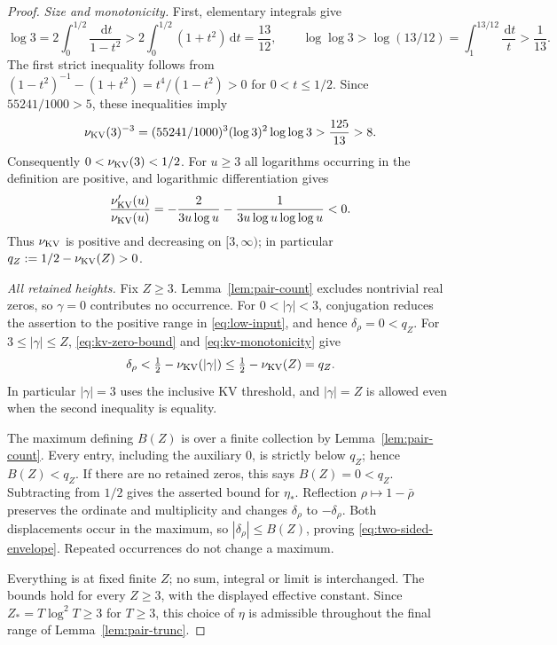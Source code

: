 \documentclass[11pt]{article}
\newcommand{\dd}{\,\mathrm d}
\begin{document}
\begin{proof}
\textit{Size and monotonicity.}
First, elementary integrals give
\[
 \log3=2\int_0^{1/2}\frac{\dd t}{1-t^2}
 >2\int_0^{1/2}(1+t^2)\dd t=\frac{13}{12},
 \qquad
 \log\log3>\log(13/12)
 =\int_1^{13/12}\frac{\dd t}{t}>\frac1{13}.
\]
The first strict inequality follows from
\((1-t^2)^{-1}-(1+t^2)=t^4/(1-t^2)>0\) for \(0<t\leq1/2\).
Since \(55241/1000>5\), these inequalities imply
\[
 \nu_{\rm KV}(3)^{-3}
 =(55241/1000)^3(\log3)^2\log\log3
 >\frac{125}{13}>8.
\]
Consequently \(0<\nu_{\rm KV}(3)<1/2\).
For \(u\geq3\) all logarithms occurring in the definition are positive,
and logarithmic differentiation gives
\begin{equation}\label{eq:kv-monotonicity}
 \frac{\nu_{\rm KV}'(u)}{\nu_{\rm KV}(u)}
 =-\frac{2}{3u\log u}
  -\frac{1}{3u\log u\log\log u}<0.
\end{equation}
Thus \(\nu_{\rm KV}\) is positive and decreasing on \([3,\infty)\);
in particular \(q_Z:=1/2-\nu_{\rm KV}(Z)>0\).

\textit{All retained heights.}
Fix \(Z\geq3\). Lemma~\ref{lem:pair-count} excludes nontrivial real
zeros, so \(\gamma=0\) contributes no occurrence.
For \(0<|\gamma|<3\), conjugation reduces the assertion to the positive
range in \eqref{eq:low-input}, and hence
\(\delta_\rho=0<q_Z\).
For \(3\leq|\gamma|\leq Z\), \eqref{eq:kv-zero-bound} and
\eqref{eq:kv-monotonicity} give
\[
 \delta_\rho<\tfrac12-\nu_{\rm KV}(|\gamma|)
 \leq\tfrac12-\nu_{\rm KV}(Z)=q_Z.
\]
In particular \(|\gamma|=3\) uses the inclusive KV threshold, and
\(|\gamma|=Z\) is allowed even when the second inequality is equality.

The maximum defining \(B(Z)\) is over a finite collection by
Lemma~\ref{lem:pair-count}. Every entry, including the auxiliary \(0\),
is strictly below \(q_Z\); hence \(B(Z)<q_Z\). If there are no
retained zeros, this says \(B(Z)=0<q_Z\).
Subtracting from \(1/2\) gives the asserted bound for \(\eta_*\).
Reflection \(\rho\mapsto1-\bar\rho\) preserves the ordinate and
multiplicity and changes \(\delta_\rho\) to \(-\delta_\rho\).
Both displacements occur in the maximum, so
\(|\delta_\rho|\leq B(Z)\), proving \eqref{eq:two-sided-envelope}.
Repeated occurrences do not change a maximum.

Everything is at fixed finite \(Z\); no sum, integral or limit is
interchanged. The bounds hold for every \(Z\geq3\), with the displayed
effective constant. Since \(Z_*=T\log^2T\geq3\) for \(T\geq3\),
this choice of \(\eta\) is admissible throughout the final range of
Lemma~\ref{lem:pair-trunc}.
\end{proof}
\end{document}
